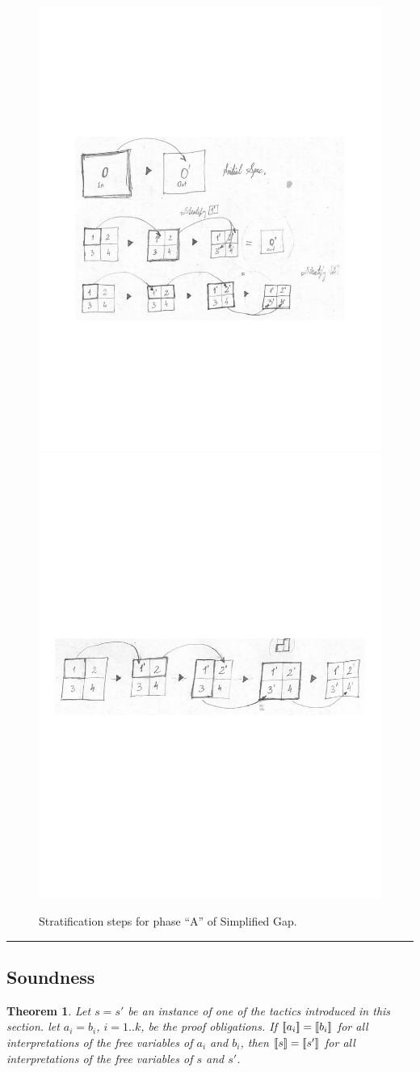 \begin{figure}
\includegraphics[width=.47\textwidth]{img/gap-stratify2}\\
\includegraphics[width=.47\textwidth]{img/gap-stratify3}
\caption{
  Stratification steps for phase ``A'' of Simplified Gap.}
\end{figure}

\hrule
\bigskip


\subsection{Soundness}

\newtheorem{theorem}{Theorem}
\renewenvironment{proof}{\noindent{\bf Proof.~}}{}

\begin{theorem}
Let $s=s'$ be an instance of one of the tactics introduced in this section.
let $a_i=b_i$, $i=1..k$, be the proof obligations. If $[\![{a_i}]\!]=[\![{b_i}]\!]$
for all interpretations of the free variables of $a_i$ and $b_i$, then
$[\![{s}]\!]=[\![{s'}]\!]$ for all interpretations of the free variables of $s$ and $s'$.
\end{theorem}

